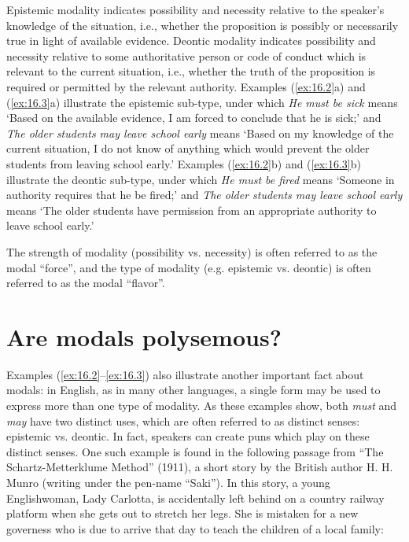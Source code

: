 Epistemic modality indicates possibility and necessity relative to the speaker’s knowledge of the situation, i.e., whether the proposition is possibly or necessarily true in light of available evidence. Deontic modality indicates possibility and necessity relative to some authoritative person or code of conduct which is relevant to the current situation, i.e., whether the truth of the proposition is required or permitted by the relevant authority. Examples (\ref{ex:16.2}a) and (\ref{ex:16.3}a) illustrate the epistemic sub-type, under which \textit{He must be sick} means ‘Based on the available evidence, I am forced to conclude that he is sick;’ and \textit{The older students may leave school early} means ‘Based on my knowledge of the current situation, I do not know of anything which would prevent the older students from leaving school early.’ Examples (\ref{ex:16.2}b) and (\ref{ex:16.3}b) illustrate the deontic sub-type, under which \textit{He must be fired} means ‘Someone in authority requires that he be fired;’ and \textit{The older students may leave school early} means ‘The older students have permission from an appropriate authority to leave school early.’



The strength of modality (possibility vs. necessity) is often referred to as the modal “force”, and the type of modality (e.g. epistemic vs. deontic) is often referred to as the modal “flavor”.


\section{Are modals polysemous?}\label{sec:16.2.1} %

Examples (\ref{ex:16.2}--\ref{ex:16.3}) also illustrate another important fact about modals: in English, as in many other languages, a single form may be used to express more than one type of modality. As these examples show, both \textit{must} and \textit{may} have two distinct uses, which are often referred to as distinct senses: epistemic vs. deontic. In fact, speakers can create puns which play on these distinct senses. One such example is found in the following passage from “The Schartz-Metterklume Method” (1911), a short story by the British author H. H. Munro (writing under the pen-name “Saki”). In this story, a young Englishwoman, Lady Carlotta, is accidentally left behind on a country railway platform when she gets out to stretch her legs. She is mistaken for a new governess who is due to arrive that day to teach the children of a local family:


